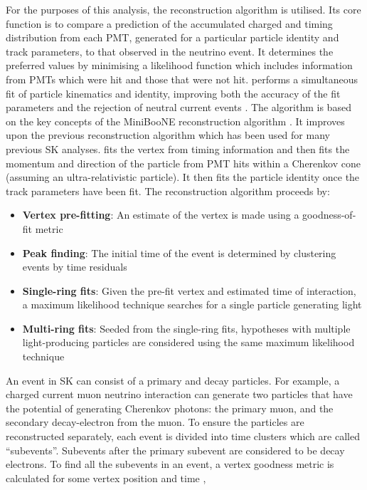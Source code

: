For the purposes of this analysis, the \fq reconstruction algorithm \cite{t2k_tn_146} is utilised. Its core function is to compare a prediction of the accumulated charged and timing distribution from each PMT, generated for a particular particle identity and track parameters, to that observed in the neutrino event. It determines the preferred values by minimising a likelihood function which includes information from PMTs which were hit and those that were not hit. \fq performs a simultaneous fit of particle kinematics and identity, improving both the accuracy of the fit parameters and the rejection of neutral current  events \cite{Abe2018, Abe2015}. The \fq algorithm is based on the key concepts of the MiniBooNE reconstruction algorithm \cite{Patterson_2009}. It improves upon the previous \apfit reconstruction algorithm which has been used for many previous SK analyses. \apfit fits the vertex from timing information and then fits the momentum and direction of the particle from PMT hits within a \quickmath{43\deg} Cherenkov cone (assuming an ultra-relativistic particle). It then fits the particle identity once the track parameters have been fit. The \fq reconstruction algorithm proceeds by:

\begin{itemize}
\item \textbf{Vertex pre-fitting}: An estimate of the vertex is made using a goodness-of-fit metric
\item \textbf{Peak finding}: The initial time of the event is determined by clustering events by time residuals
\item \textbf{Single-ring fits}: Given the pre-fit vertex and estimated time of interaction, a maximum likelihood technique searches for a single particle generating light
\item \textbf{Multi-ring fits}: Seeded from the single-ring fits, hypotheses with multiple light-producing particles are considered using the same maximum likelihood technique
\end{itemize}

An event in SK can consist of a primary and decay particles. For example, a charged current muon neutrino interaction can generate two particles that have the potential of generating Cherenkov photons: the primary muon, and the secondary decay-electron from the muon. To ensure the particles are reconstructed separately, each event is divided into time clusters which are called ``subevents''. Subevents after the primary subevent are considered to be decay electrons. To find all the subevents in an event, a vertex goodness metric is calculated for some vertex position  and time ,

